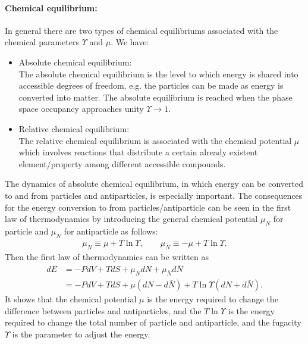 \paragraph{Chemical equilibrium:}
In general there are two types of chemical equilibriums associated with the chemical parameters $\Upsilon$ and $\mu$. We have:
\begin{itemize}
\item Absolute chemical equilibrium:\\
The absolute chemical equilibrium is the level to which energy is shared into accessible degrees of freedom, e.g. the particles can be made as energy is converted into matter.
The absolute equilibrium is reached when the phase space occupancy approaches unity $\Upsilon\to1$. 
 \item Relative chemical equilibrium:\\
 The relative chemical equilibrium is associated with the chemical potential $\mu$ which involves reactions that distribute a certain already existent element/property among different accessible compounds. 
 \end{itemize}
The dynamics of absolute chemical equilibrium, in which energy can be converted to and from particles and antiparticles, is especially important. The consequences for the energy conversion to from particles/antiparticle can be seen in the first law of thermodynamics by introducing the general chemical potential $\mu_N$ for particle and $\mu_{\bar{N}}$ for antiparticle as follows:
\begin{align}
\mu_N\equiv\mu+T\ln\Upsilon,\qquad{\mu_{\bar{N}}}\equiv{-\mu}+T\ln\Upsilon.
\end{align}
Then the first law of thermodynamics can be written as
\begin{align}
dE&=-PdV+TdS+{\mu_N}dN+{\mu_{\bar{N}}}d{\bar{N}}
\\&=-PdV+TdS+{\mu}(dN-d{\bar{N}})+T\ln{\Upsilon}(dN+d{\bar{N}}).
\end{align}
It shows that the chemical potential $\mu$ is the energy required to change the difference between particles and antiparticles, and the $T\ln\Upsilon$ is the energy required to change the total number of particle and antiparticle, and the fugacity $\Upsilon$ is the parameter to adjust the energy.

